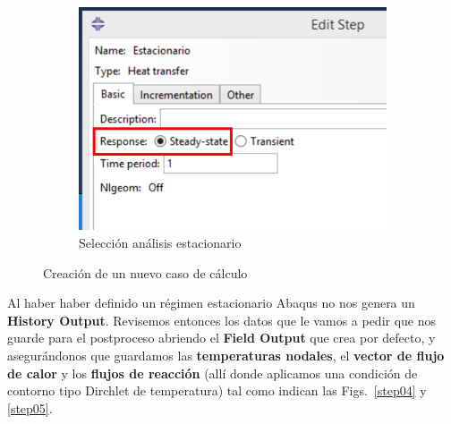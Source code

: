 \begin{figure}[!h]
\begin{subfigure}[!h]{0.39\textwidth}
      \includegraphics[width=\textwidth]{./body/images/step03.pdf}
      \caption{Selección análisis estacionario}
      \label{step03}
    \end{subfigure}%
    \caption{Creación de un nuevo caso de cálculo}
  \end{figure}

  Al haber haber definido un régimen estacionario Abaqus no nos
  genera un \textbf{History Output}. Revisemos entonces los datos que
  le vamos a pedir que nos guarde para el postproceso abriendo el
  \textbf{Field Output} que crea por defecto, y asegurándonos que
  guardamos las \textbf{temperaturas nodales}, el \textbf{vector de
    flujo de calor} y los \textbf{flujos de reacción} (allí donde
  aplicamos una condición de contorno tipo Dirchlet de temperatura)
  tal como indican las Figs.~\ref{step04} y \ref{step05}.

